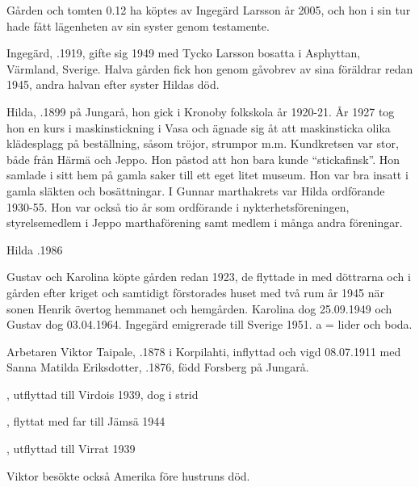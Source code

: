
Gården och tomten 0.12 ha köptes av Ingegärd Larsson år 2005, och hon i sin tur hade fått lägenheten av sin syster genom testamente.\jhvspace{}


Ingegärd, .1919, gifte sig 1949 med Tycko Larsson bosatta i Asphyttan, Värmland, Sverige. Halva gården fick hon genom gåvobrev av sina föräldrar redan 1945, andra halvan efter syster Hildas död.\jhvspace{}



Hilda, .1899 på Jungarå, hon gick i Kronoby folkskola år 1920-21. År 1927 tog hon en kurs i maskinstickning i Vasa och ägnade sig åt att maskinsticka olika klädesplagg på beställning, såsom tröjor, strumpor m.m. Kundkretsen var stor, både från Härmä och Jeppo. Hon påstod att hon bara kunde ``stickafinsk''. Hon samlade i sitt hem på gamla saker till ett eget litet museum. Hon var bra insatt i gamla släkten och bosättningar. I Gunnar marthakrets var Hilda ordförande 1930-55. Hon var också tio år som ordförande i nykterhetsföreningen, styrelsemedlem i Jeppo marthaförening samt medlem i många andra föreningar.

Hilda .1986


Gustav och Karolina köpte gården redan 1923, de flyttade in med döttrarna  och  i gården efter kriget och samtidigt förstorades huset med två rum år 1945 när sonen Henrik övertog hemmanet och hemgården. Karolina dog 25.09.1949 och Gustav dog 03.04.1964. Ingegärd emigrerade till Sverige 1951.  a = lider och 	boda.


Arbetaren Viktor Taipale, .1878 i Korpilahti, inflyttad och vigd 08.07.1911 med Sanna Matilda Eriksdotter, .1876, född Forsberg på Jungarå.
\begin{jhchildren}
  \item {}, utflyttad till Virdois 1939, dog i strid
  \item {}
  \item {}, flyttat med far till Jämsä 1944
  \item {}
  \item {}, utflyttad till Virrat 1939
\end{jhchildren}
Viktor besökte också Amerika före hustruns död.


